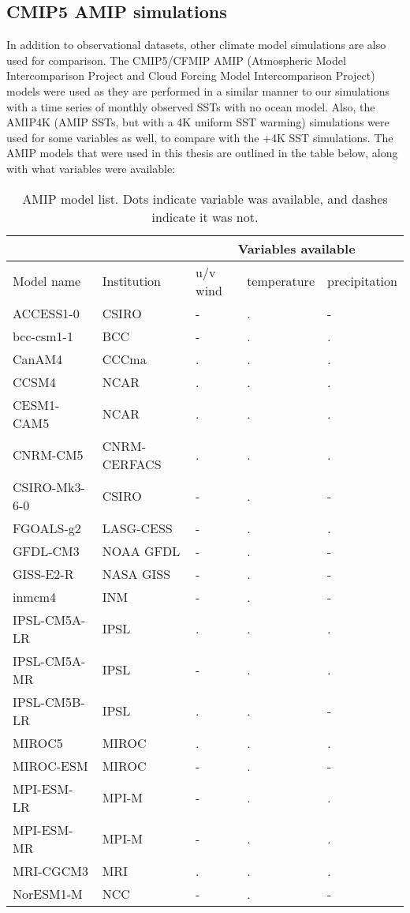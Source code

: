\documentclass[letterpaper,12pt,titlepage,oneside,final]{book}
\begin{document}
\subsection{CMIP5 AMIP simulations}
In addition to observational datasets, other climate model simulations are also used for comparison. The CMIP5/CFMIP AMIP (Atmospheric Model Intercomparison Project and Cloud Forcing Model Intercomparison Project) \citep{bony_cfmip:_2011} models were used as they are performed in a similar manner to our simulations with a time series of monthly observed SSTs with no ocean model. Also, the AMIP4K (AMIP SSTs, but with a 4K uniform SST warming) simulations were used for some variables as well, to compare with the +4K SST simulations. The AMIP models that were used in this thesis are outlined in the table below, along with what variables were available:

\begin{table}[H]
\caption{\footnotesize AMIP model list. Dots indicate variable was available, and dashes indicate it was not.}
\label{tab:amip}
\begin{tabular}{|p{4cm}||p{3.5cm}|p{2cm}|p{2.25cm}|p{2.25cm}|}
\hline
&&\multicolumn{3}{|c|}{Variables available}\\
\hline
Model name&Institution&u/v wind&temperature&precipitation\\ \hline
ACCESS1-0&CSIRO&-&.&-\\   \hline
bcc-csm1-1&BCC&-&.&.\\ \hline
CanAM4&CCCma&.&.&.\\ \hline
CCSM4&NCAR&.&.&.\\ \hline
CESM1-CAM5&NCAR&.&.&.\\ \hline
CNRM-CM5&CNRM-CERFACS&.&.&.\\ \hline
CSIRO-Mk3-6-0&CSIRO&-&.&-\\ \hline
FGOALS-g2&LASG-CESS&-&.&.\\ \hline
GFDL-CM3&NOAA GFDL&-&.&-\\ \hline
GISS-E2-R&NASA GISS&-&.&-\\ \hline
inmcm4&INM&-&.&-\\ \hline
IPSL-CM5A-LR&IPSL&.&.&.\\ \hline
IPSL-CM5A-MR&IPSL&-&.&.\\ \hline
IPSL-CM5B-LR&IPSL&.&.&-\\ \hline
MIROC5&MIROC&.&.&.\\ \hline
MIROC-ESM&MIROC&-&.&-\\ \hline
MPI-ESM-LR&MPI-M&-&.&.\\ \hline
MPI-ESM-MR&MPI-M&-&.&.\\ \hline
MRI-CGCM3&MRI&.&.&.\\ \hline
NorESM1-M&NCC&-&.&-\\\hline

\end{tabular}
\end{table}
\end{document}
